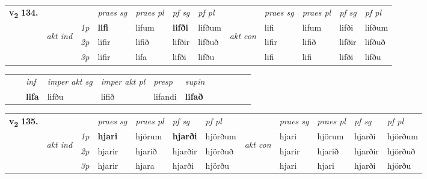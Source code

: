 \begin{tabular}{llllllllllll} \toprule
\multirow{4}{*}{{{\textbf{v{\textsubscript{2}}} \Large{\textbf{134.}}}}}  & &   &  \textit{praes sg}  & \textit{praes pl}  &\textit{ pf sg} & \textit{pf pl} &  &  \textit{praes sg}  & \textit{praes pl}  & \textit{pf sg} & \textit{pf pl } \\*
	\cmidrule{4-7} \cmidrule{9-12}
 & \multirow{3}{*}{\begin{turn}{90}\textit{akt ind}\end{turn}} & {\textit{1p}} & \textbf{lifi} & lifum    & \textbf{lifði} & lifðum & \multirow{3}{*}{\begin{turn}{90}\textit{akt con}\end{turn}} &lifi & lifum & lifði & lifðum\\*
& &  {\textit{2p}} &  lifir  & lifið   & lifðir & lifðuð & & lifir & lifið & lifðir & lifðuð \\*
& &  {\textit{3p}} & lifir & lifa   & lifði & lifðu & & lifi & lifi& lifði & lifðu  \\*
\cmidrule{4-7} \cmidrule{9-12}
\end{tabular}


\begin{tabular}{llllllllllll}
 & & \textit{inf} & \textit{imper akt sg} & \textit{imper akt pl}   & \textit{presp} & \textit{supin}       \\*
  & & \textbf{lifa} & lifðu  & lifið   & lifandi &  \textbf{lifað}   \\*
\cmidrule{1-12}
\end{tabular}



\begin{tabular}{llllllllllll} \toprule
\multirow{4}{*}{{{\textbf{v{\textsubscript{2}}} \Large{\textbf{135.}}}}}  & &   &  \textit{praes sg}  & \textit{praes pl}  &\textit{ pf sg} & \textit{pf pl} &  &  \textit{praes sg}  & \textit{praes pl}  & \textit{pf sg} & \textit{pf pl } \\*
	\cmidrule{4-7} \cmidrule{9-12}
 & \multirow{3}{*}{\begin{turn}{90}\textit{akt ind}\end{turn}} & {\textit{1p}} & \textbf{hjari} & hjörum    & \textbf{hjarði} & hjörðum & \multirow{3}{*}{\begin{turn}{90}\textit{akt con}\end{turn}} &hjari & hjörum & hjarði & hjörðum\\*
& &  {\textit{2p}} &  hjarir  & hjarið   & hjarðir & hjörðuð & & hjarir & hjarið & hjarðir & hjörðuð \\*
& &  {\textit{3p}} & hjarir & hjara   & hjarði & hjörðu & & hjari & hjari& hjarði & hjörðu  \\*
\cmidrule{4-7} \cmidrule{9-12}
\end{tabular}


